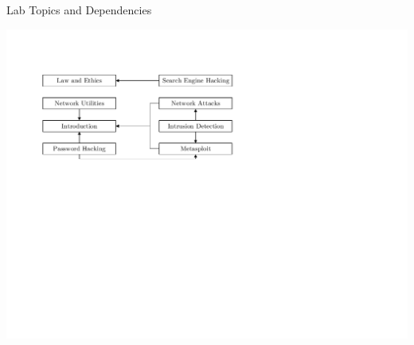 \documentclass{beamer}
\begin{document}
	\begin{frame}{Lab Topics and Dependencies}
		\begin{center}
		\includegraphics[width=\textwidth,clip=true, trim=0.85in 4.75in 4.5in 1.2in]{../paper/dependencies-between-labs.pdf}
		\end{center}		
	\end{frame}	
	
\end{document}
